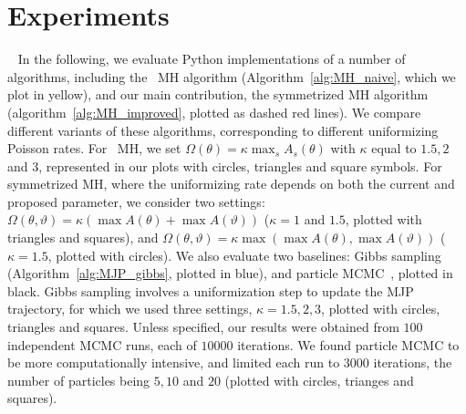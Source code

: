 \section{Experiments}\label{sec:expts}~
In the following, we evaluate Python implementations of a number of algorithms, including the \naive\ MH algorithm (Algorithm~\ref{alg:MH_naive}, which we plot in yellow), and our main contribution, the symmetrized MH algorithm (algorithm~\ref{alg:MH_improved}, plotted as dashed red lines). 
We compare different variants of these algorithms, corresponding to different uniformizing Poisson rates. %
For \naive\ MH, we set $\Omega(\theta) = \kappa \max_s A_s(\theta) $ with $\kappa$  equal to $1.5, 2$ and $3$, represented in our plots with circles, triangles and square symbols. 
For symmetrized MH, where the uniformizing rate depends on both the current and proposed parameter, we consider two settings:
 $\Omega(\theta, \vartheta) = \kappa (\max A(\theta) + \max A(\vartheta))$ 
 ($\kappa = 1$ and $1.5$, plotted with {triangles} and {squares}), and 
$\Omega(\theta, \vartheta) = \kappa \max(\max A(\theta), \max A(\vartheta))$
($\kappa=1.5$, plotted with {circles}).  
We also evaluate two baselines: Gibbs sampling (Algorithm~\ref{alg:MJP_gibbs}, plotted in blue), and particle MCMC~\citep{Andrieu10}, plotted in black. 
Gibbs sampling involves a uniformization step to update the MJP trajectory, for which we used three settings, $\kappa=1.5,2,3$, plotted with circles, {triangles} and {squares}.  
Unless specified, our results were obtained from $100$ independent MCMC runs, each of $10000$ iterations.
We found particle MCMC to be more computationally intensive, and limited each run to $3000$ iterations, the number of particles being $5, 10$ and $20$ (plotted with circles, trianges and squares). 


